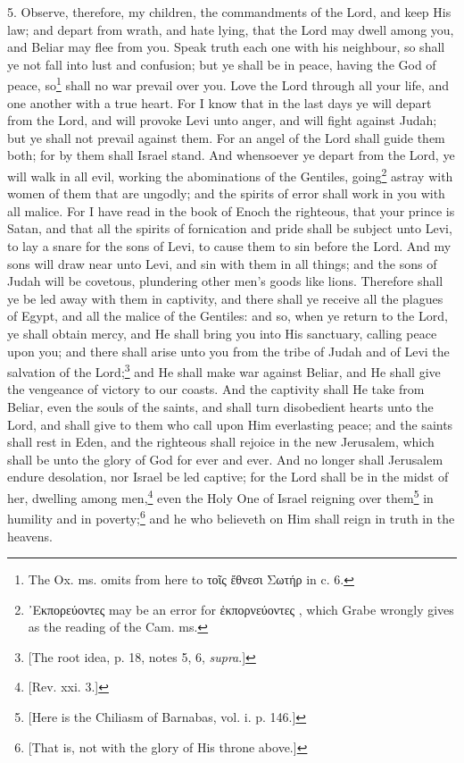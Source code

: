 5. Observe, therefore, my children, the commandments of the Lord, and keep His law; and depart from wrath, and hate lying, that the Lord may dwell among you, and Beliar may flee from you. Speak truth each one with his neighbour, so shall ye not fall into lust and confusion; but ye shall be in peace, having the God of peace, so\footnote{The Ox. ms. omits from here to \textgreek{τοῖς ἔθνεσι Σωτήρ} in c. 6.} shall no war prevail over you. Love the Lord through all your life, and one another with a true heart. For I know that in the last days ye will depart from the Lord, and will provoke Levi unto anger, and will fight against Judah; but ye shall not prevail against them. For an angel of the Lord shall guide them both; for by them shall Israel stand. And whensoever ye depart from the Lord, ye will walk in all evil, working the abominations of the Gentiles, going\footnote{\textgreek{᾽Εκπορεύοντες} may be an error for \textgreek{ἐκπορνεύοντες} , which Grabe wrongly gives as the reading of the Cam. ms.} astray with women of them that are ungodly; and the spirits of error shall work in you with all malice. For I have read in the book of Enoch the righteous, that your prince is Satan, and that all the spirits of fornication and pride shall be subject unto Levi, to lay a snare for the sons of Levi, to cause them to sin before the Lord. And my sons will draw near unto Levi, and sin with them in all things; and the sons of Judah will be covetous, plundering other men’s goods like lions. Therefore shall ye be led away with them in captivity, and there shall ye receive all the plagues of Egypt, and all the malice of the Gentiles: and so, when ye return to the Lord, ye shall obtain mercy, and He shall bring you into His sanctuary, calling peace upon you; and there shall arise unto you from the tribe of Judah and of Levi the salvation of the Lord;\footnote{[The root idea, p. 18, notes 5, 6, \emph{supra}.]} and He shall make war against Beliar, and He shall give the vengeance of victory to our coasts. And the captivity shall He take from Beliar, even the souls of the saints, and shall turn disobedient hearts unto the Lord, and shall give to them who call upon Him everlasting peace; and the saints shall rest in Eden, and the righteous shall rejoice in the new Jerusalem, which shall be unto the glory of God for ever and ever. And no longer shall Jerusalem endure desolation, nor Israel be led captive; for the Lord shall be in the midst of her, dwelling among men,\footnote{[Rev. xxi. 3.]} even the Holy One of Israel reigning over them\footnote{[Here is the Chiliasm of Barnabas, vol. i. p. 146.]} in humility and in poverty;\footnote{[That is, not with the glory of His throne above.]} and he who believeth on Him shall reign in truth in the heavens.

